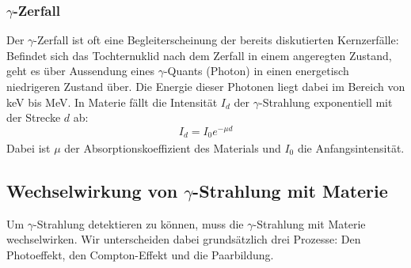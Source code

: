\documentclass[12pt,listof=totoc]{scrartcl}
\begin{document}
\subsubsection{$\gamma$-Zerfall \label{gamma}}

Der $\gamma$-Zerfall ist oft eine Begleiterscheinung der bereits diskutierten Kernzerfälle: Befindet sich das Tochternuklid nach dem Zerfall in einem angeregten Zustand, geht es über Aussendung eines $\gamma$-Quants (Photon) in einen energetisch niedrigeren Zustand über. Die Energie dieser Photonen liegt dabei im Bereich von keV bis MeV. In Materie fällt die Intensität $I_d$ der $\gamma$-Strahlung exponentiell mit der Strecke $d$ ab:
\[I_d=I_0e^{-\mu d}\]
Dabei ist $\mu$ der Absorptionskoeffizient des Materials und $I_0$ die Anfangsintensität.\textsuperscript{\cite{Demtröder}}

%

\subsection{Wechselwirkung von $\gamma$-Strahlung mit Materie}
Um $\gamma$-Strahlung detektieren zu können, muss die $\gamma$-Strahlung mit Materie wechselwirken. Wir unterscheiden dabei grundsätzlich drei Prozesse: Den Photoeffekt, den Compton-Effekt und die Paarbildung.
\end{document}
